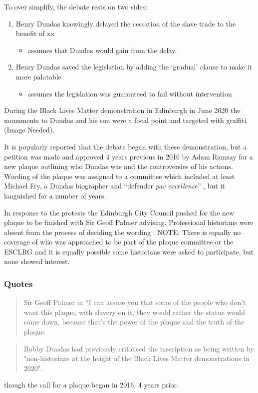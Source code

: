 \documentclass{scrartcl}
\begin{document}
To over simplify, the debate rests on two sides:

\begin{enumerate}
    \item Henry Dundas knowingly delayed the cessation of the slave trade to the benefit of xx
    \begin{itemize}
        \item assumes that Dundas would gain from the delay.
    \end{itemize}
    \item Henry Dundas saved the legislation by adding the `gradual' clause to make it more palatable 
    \begin{itemize}
        \item assumes the legislation was guaranteed to fail without intervention
    \end{itemize}
\end{enumerate}

During the Black Lives Matter demonstration in Edinburgh in June 2020 the monuments to Dundas and his son were a focal point and targeted with graffiti (Image Needed). 

It is popularly reported that the debate began with these demonstration, but a petition was made and approved 4 years previous in 2016 by Adam Ramsay \cite{mullen_2021} for a new plaque outlining who Dundas was and the controversies of his actions. Wording of the plaque was assigned to a committee which included at least Michael Fry, a Dundas biographer and ``defender \textit{par excellence}'' \cite{mccarthy_2022}, but it languished for a number of years.

In response to the protests the Edinburgh City Council pushed for the new plaque to be finished with Sir Geoff Palmer advising. Professional historians were absent from the process of deciding the wording \cite{scotsman_2022}. NOTE: There is equally no coverage of who was approached to be part of the plaque committee or the ESCLRG and it is equally possible some historians were asked to participate, but none showed interest.

\subsubsection{Quotes}
\begin{quotation}{Sir Geoff Palmer in \cite{anderson_2021}}
    “I can assure you that some of the people who don’t want this plaque, with slavery on it, they would rather the statue would come down, because that’s the power of the plaque and the truth of the plaque.
\end{quotation}
\begin{quote}
    Bobby Dundas had previously criticised the inscription as being written by "non-historians at the height of the Black Lives Matter demonstrations in 2020".
\end{quote}\cite{bbc_2024} though the call for a plaque began in 2016, 4 years prior.
\end{document}
